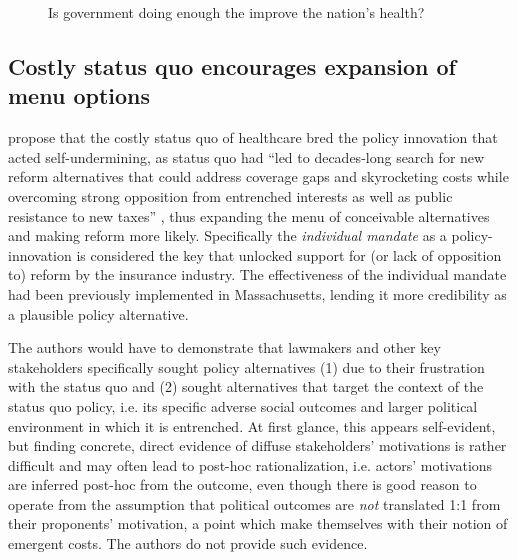 \documentclass[11pt]{article}
\begin{document}
\begin{figure}[!ht]
  \sffamily
  \caption{Is government doing enough the improve the nation's health?}
  
  \label{fig:gss3}
\end{figure}

\subsection*{Costly status quo encourages expansion of menu options}

\textcite[][]{Jacobs2014} propose that the costly status quo of healthcare bred the policy innovation that acted self-undermining, as status quo had \enquote{led to decades-long search for new reform alternatives that could address coverage gaps and skyrocketing costs while overcoming strong opposition from entrenched interests as well as public resistance to new taxes} , thus expanding the menu of conceivable alternatives and making reform more likely. Specifically the \textit{individual mandate} as a policy-innovation is considered the key that unlocked support for (or lack of opposition to) reform by the insurance industry. The effectiveness of the individual mandate had been previously implemented in Massachusetts, lending it more credibility as a plausible policy alternative.

The authors would have to demonstrate that lawmakers and other key stakeholders specifically sought policy alternatives (1) due to their frustration with the status quo and (2) sought alternatives that target the context of the status quo policy, i.e. its specific adverse social outcomes and larger political environment in which it is entrenched. At first glance, this appears self-evident, but finding concrete, direct evidence of diffuse stakeholders' motivations is rather difficult and may often lead to post-hoc rationalization, i.e.  actors' motivations are inferred post-hoc from the outcome, even though there is good reason to operate from the assumption that political outcomes are \textit{not} translated 1:1 from their proponents' motivation, a point which \textcite[][]{Jacobs2014} make themselves with their notion of emergent costs. The authors do not provide such evidence.
\end{document}
